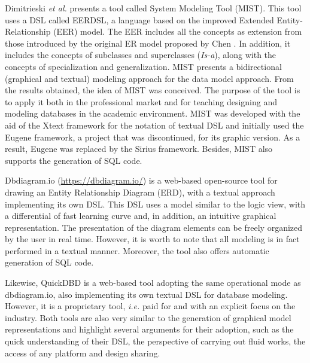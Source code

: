 \documentclass[a4paper,twoside,anonymous]{article}
\begin{document}
Dimitrieski \textit{et al.} \cite{Celikovic:2014,Dimitrieski:2015} presents a tool called System Modeling Tool (MIST).
This tool uses a DSL called EERDSL, a language based on the improved Extended Entity-Relationship (EER) model.
The EER includes all the concepts as extension from those introduced by the original ER model proposed by Chen \cite{Chen:1976}.
In addition, it includes the concepts of subclasses and superclasses (\textit{Is-a}), along with the concepts of specialization and generalization.
MIST presents a bidirectional (graphical and textual) modeling approach for the data model approach. 
From the results obtained, the idea of MIST was conceived.
The purpose of the tool is to apply it both in the professional market and for teaching designing and modeling databases in the academic environment. 
MIST was developed with the aid of the Xtext framework for the notation of textual DSL and initially used the Eugene framework, a project that was discontinued, for its graphic version. 
As a result, Eugene was replaced by the Sirius framework. Besides, MIST also supports the generation of SQL code.

Dbdiagram.io (\url{https://dbdiagram.io/})
is a web-based open-source tool for drawing an Entity Relationship Diagram (ERD), with a textual approach implementing its own DSL.
This DSL uses a model similar to the logic view, with a differential of fast learning curve and, in addition, an intuitive graphical representation.
The presentation of the diagram elements can be freely organized by the user in real time.
However, it is worth to note that all modeling is in fact performed in a textual manner.
Moreover, the tool also offers automatic generation of SQL code.

Likewise, QuickDBD %
is a web-based tool adopting  the same operational mode as dbdiagram.io, also implementing its own textual DSL for database modeling.
However, it is a proprietary tool, \textit{i.e.} paid for and with an explicit focus on the industry.
Both tools are also very similar to the generation of graphical model representations and highlight several arguments for their adoption, such as the quick understanding of their DSL, the perspective of carrying out fluid works, the access of any platform and design sharing.
\end{document}
